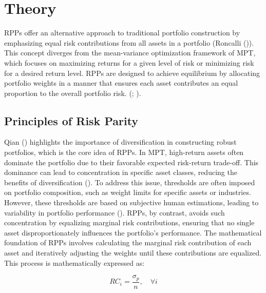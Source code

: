 \documentclass[11pt,preprint]{elsarticle}
\numberwithin{equation}{section}
\numberwithin{figure}{section}
\numberwithin{table}{section}
\begin{document}
\section{Theory}\label{theory}

RPPs offer an alternative approach to traditional portfolio construction
by emphasizing equal risk contributions from all assets in a portfolio
(Roncalli ()). This concept
diverges from the mean-variance optimization framework of MPT, which
focuses on maximizing returns for a given level of risk or minimizing
risk for a desired return level. RPPs are designed to achieve
equilibrium by allocating portfolio weights in a manner that ensures
each asset contributes an equal proportion to the overall portfolio
risk. (; ).

\subsection{Principles of Risk Parity}\label{principles-of-risk-parity}

Qian () highlights the importance of
diversification in constructing robust portfolios, which is the core
idea of RPPs. In MPT, high-return assets often dominate the portfolio
due to their favorable expected risk-return trade-off. This dominance
can lead to concentration in specific asset classes, reducing the
benefits of diversification ().
To address this issue, thresholds are often imposed on portfolio
composition, such as weight limits for specific assets or industries.
However, these thresholds are based on subjective human estimations,
leading to variability in portfolio performance
().
RPPs, by contrast, avoids such concentration by equalizing marginal risk
contributions, ensuring that no single asset disproportionately
influences the portfolio's performance. The mathematical foundation of
RPPs involves calculating the marginal risk contribution of each asset
and iteratively adjusting the weights until these contributions are
equalized. This process is mathematically expressed as:

\begin{equation}
RC_i = \frac{\sigma_p}{n}, \quad \forall i
\end{equation}
\end{document}
